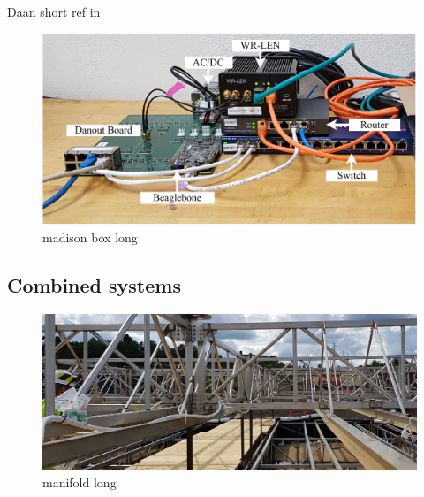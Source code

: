 Daan short ref in~\cite{eijk2018}

\begin{figure} %
    \includegraphics[width=\textwidth]{diagrams/5-daq/madison_box.pdf}
    \caption[madison box short]
    {madison box long}
    \label{fig:madison_box}
\end{figure}

\subsection{Combined systems} %
\label{sec:daq_hard_combined} %

\begin{figure} %
    \includegraphics[width=\textwidth]{diagrams/5-daq/manifold.jpg}
    \caption[manifold short]
    {manifold long}
    \label{fig:manifold}
\end{figure}


